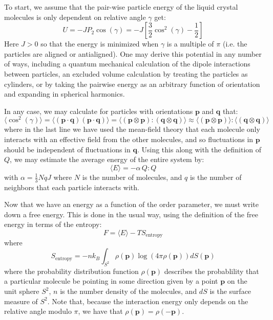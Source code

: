 \documentclass[reqno]{article}
\begin{document}
  To start, we assume that the pair-wise particle energy of the liquid crystal
  molecules is only dependent on relative angle $\gamma$ get:
  \begin{equation} \label{eq:maier-saupe-pairwise}
    U = -J P_2 \cos(\gamma) = -J \left[ \frac32 \cos^2(\gamma) - \frac12 \right]
  \end{equation}
  Here $J > 0$ so that the energy is minimized when $\gamma$ is a multiple of
  $\pi$ (i.e. the particles are aligned or antialigned).
  One may derive this potential in any number of ways, including a quantum
  mechanical calculation of the dipole interactions between particles, an
  excluded volume calculation by treating the particles as cylinders, or by
  taking the pairwise energy as an arbitrary function of orientation and
  expanding in spherical harmonics.

  In any case, we may calculate for particles with orientations $\mathbf{p}$ and
  $\mathbf{q}$ that:
  \begin{equation}
    \langle \cos^2(\gamma) \rangle
    =
    \langle (\mathbf{p}\cdot \mathbf{q}) (\mathbf{p} \cdot \mathbf{q}) \rangle
    =
    \langle (\mathbf{p} \otimes \mathbf{p}) : (\mathbf{q} \otimes \mathbf{q}) \rangle
    \approx
    \langle (\mathbf{p} \otimes \mathbf{p}) \rangle : \langle (\mathbf{q} \otimes \mathbf{q}) \rangle
  \end{equation}
  where in the last line we have used the mean-field theory that each molecule
  only interacts with an effective field from the other molecules, and so
  fluctuations in $\mathbf{p}$ should be independent of fluctuations in
  $\mathbf{q}$.
  Using this along with the definition of $Q$, we may estimate the average
  energy of the entire system by:
  \begin{equation}
    \langle E \rangle
    =
    -\alpha \, Q : Q
  \end{equation}
  with $\alpha = \frac13 N q J$ where $N$ is the number of molecules, and $q$ is
  the number of neighbors that each particle interacts with.

  Now that we have an energy as a function of the order parameter, we must write
  down a free energy.
  This is done in the usual way, using the definition of the free energy in
  terms of the entropy:
  \begin{equation} \label{eq:standard-free-energy}
    F = \langle E \rangle - TS_\text{entropy}
  \end{equation}
  where
  \begin{equation}
    S_\text{entropy}
    =
    -n k_B \int_{S^2} \rho(\mathbf{p}) \log \left( 4 \pi \rho(\mathbf{p})\right) dS (\mathbf{p})
  \end{equation}
  where the probability distribution function $\rho(\mathbf{p})$ describes the probablility
  that a particular molecule be pointing in some direction given by a point $\mathbf{p}$ on
  the unit sphere $S^2$, $n$ is the number density of the molecules, and $dS$ is
  the surface measure of $S^2$.
  Note that, because the interaction energy only depends on the relative angle
  modulo $\pi$, we have that $\rho(\mathbf{p}) = \rho(-\mathbf{p})$.
\end{document}
